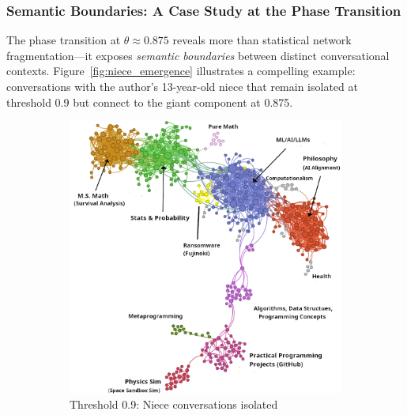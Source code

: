 
\subsubsection{Semantic Boundaries: A Case Study at the Phase Transition}

The phase transition at $\theta \approx 0.875$ reveals more than statistical network fragmentation—it exposes \emph{semantic boundaries} between distinct conversational contexts. Figure~\ref{fig:niece_emergence} illustrates a compelling example: conversations with the author's 13-year-old niece that remain isolated at threshold 0.9 but connect to the giant component at 0.875.

\begin{figure}[h]
\centering
\begin{subfigure}{0.48\textwidth}
    \centering
    \includegraphics[width=\textwidth]{./images/cluster-vis-topics-better.png}
    \caption{Threshold 0.9: Niece conversations isolated}
    \label{fig:network_09}
\end{subfigure}
\hfill
\begin{subfigure}{0.48\textwidth}
    \centering

\end{subfigure}
\end{figure}

